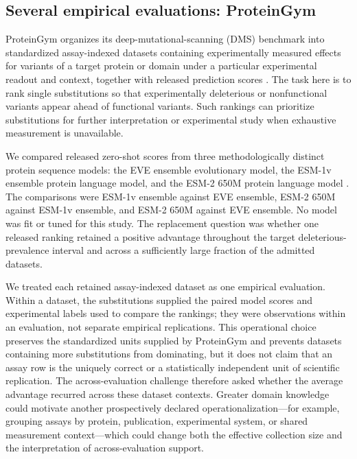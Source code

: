 \documentclass[11pt]{article}
\theoremstyle{remark}
\begin{document}
\subsection{Several empirical evaluations: ProteinGym}
\label{sec:proteingym-illustration}

ProteinGym organizes its deep-mutational-scanning (DMS) benchmark into
standardized assay-indexed datasets containing experimentally measured effects
for variants of a target protein or domain under a particular experimental
readout and context, together with released prediction scores
\cite{notin2023proteingym}. The task here is to rank single substitutions so
that experimentally deleterious or nonfunctional variants appear ahead of
functional variants. Such rankings can prioritize substitutions for further
interpretation or experimental study when exhaustive measurement is
unavailable.

We compared released zero-shot scores from three methodologically distinct
protein sequence models: the EVE ensemble evolutionary model, the ESM-1v
ensemble protein language model, and the ESM-2 650M protein language model
\cite{frazer2021eve,meier2021esm1v,lin2023esm2}. The comparisons were ESM-1v
ensemble against EVE ensemble, ESM-2 650M against ESM-1v ensemble, and ESM-2
650M against EVE ensemble. No model was fit or tuned for this study. The
replacement question was whether one released ranking retained a positive
advantage throughout the target deleterious-prevalence interval and across a
sufficiently large fraction of the admitted datasets.

We treated each retained assay-indexed dataset as one empirical evaluation.
Within a dataset, the substitutions supplied the paired model scores and
experimental labels used to compare the rankings; they were observations
within an evaluation, not separate empirical replications. This operational
choice preserves the standardized units supplied by ProteinGym and prevents
datasets containing more substitutions from dominating, but it does not claim
that an assay row is the uniquely correct or a statistically independent unit
of scientific replication. The across-evaluation challenge therefore asked
whether the average advantage recurred across these dataset contexts. Greater
domain knowledge could motivate another prospectively declared
operationalization---for example, grouping assays by protein, publication,
experimental system, or shared measurement context---which could change both
the effective collection size and the interpretation of across-evaluation
support.
\end{document}
